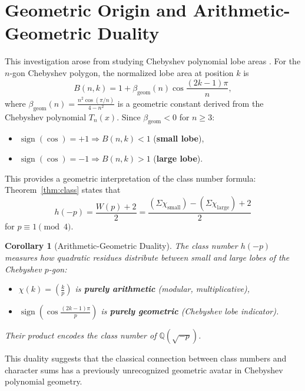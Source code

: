 \documentclass[11pt,a4paper]{article}
\newtheorem{corollary}[theorem]{Corollary}
\begin{document}
\section{Geometric Origin and Arithmetic-Geometric Duality}

This investigation arose from studying Chebyshev polynomial lobe areas \cite{Popelka2025integral}. For the $n$-gon Chebyshev polygon, the normalized lobe area at position $k$ is
\[
B(n,k) = 1 + \beta_{\text{geom}}(n) \cos\frac{(2k-1)\pi}{n},
\]
where $\beta_{\text{geom}}(n) = \frac{n^2\cos(\pi/n)}{4-n^2}$ is a geometric constant derived from the Chebyshev polynomial $T_n(x)$. Since $\beta_{\text{geom}} < 0$ for $n \geq 3$:
\begin{itemize}
\item $\operatorname{sign}(\cos) = +1 \Rightarrow B(n,k) < 1$ (\textbf{small lobe}),
\item $\operatorname{sign}(\cos) = -1 \Rightarrow B(n,k) > 1$ (\textbf{large lobe}).
\end{itemize}

This provides a geometric interpretation of the class number formula: Theorem~\ref{thm:class} states that
\[
h(-p) = \frac{W(p) + 2}{2} = \frac{(\Sigma\chi_{\text{small}}) - (\Sigma\chi_{\text{large}}) + 2}{2}
\]
for $p \equiv 1 \pmod 4$.

\begin{corollary}[Arithmetic-Geometric Duality]
The class number $h(-p)$ measures how quadratic residues distribute between small and large lobes of the Chebyshev $p$-gon:
\begin{itemize}
\item $\chi(k) = \left(\frac{k}{p}\right)$ is \textbf{purely arithmetic} (modular, multiplicative),
\item $\operatorname{sign}(\cos\frac{(2k-1)\pi}{p})$ is \textbf{purely geometric} (Chebyshev lobe indicator).
\end{itemize}
Their product encodes the class number of $\mathbb{Q}(\sqrt{-p})$.
\end{corollary}

This duality suggests that the classical connection between class numbers and character sums has a previously unrecognized geometric avatar in Chebyshev polynomial geometry.



\end{document}
